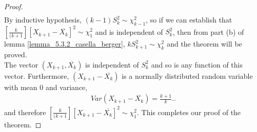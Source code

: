 \documentclass[a4paper,english,12pt]{article}
\begin{document}
\begin{proof}
\begin{align}
\end{align}
By inductive hypothesis, $(k-1)S_k ^2 \sim \chi_{k-1} ^2$, so if we can establish that $[\frac{k}{(k+1}][X_{k+1} - \overline{X_k}]^2\sim \chi_{1} ^2$ and is independent of $S_k ^2$, then from part (b) of lemma \ref{lemma_5.3.2_casella_berger}, $kS_{k+1} ^2\sim \chi_k ^2$ and the theorem will be proved.\\
The vector $(X_{k+1},\overline{X_k})$ is independent of $S_k ^2$ and so is any function of this vector. Furthermore, $(X_{k+1} - \overline{X_k})$ is a normally distributed random variable with mean 0 and variance,
\begin{align}
Var(X_{k+1} - \overline{X_k})=\frac{k+1}{k}. \nonumber.
\end{align}
and therefore $[\frac{k}{(k+1}][X_{k+1} - \overline{X_k}]^2\sim \chi_{1} ^2$. This completes our proof of the theorem.
\end{proof}
\end{document}
